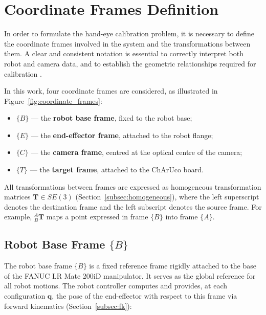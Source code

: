 \section{Coordinate Frames Definition}
\label{sec:coordinate_frames}

In order to formulate the hand-eye calibration problem, it is necessary to
define the coordinate frames involved in the system and the transformations
between them. A clear and consistent notation is essential to correctly
interpret both robot and camera data, and to establish the geometric
relationships required for calibration \cite{craig2005introduction,
siciliano2009robotics}.

In this work, four coordinate frames are considered, as illustrated in
Figure~\ref{fig:coordinate_frames}:

\begin{itemize}
    \item $\{B\}$ — the \textbf{robot base frame}, fixed to the robot base;
    \item $\{E\}$ — the \textbf{end-effector frame}, attached to the robot flange;
    \item $\{C\}$ — the \textbf{camera frame}, centred at the optical centre of
    the camera;
    \item $\{T\}$ — the \textbf{target frame}, attached to the ChArUco board.
\end{itemize}

All transformations between frames are expressed as homogeneous transformation
matrices $\mathbf{T} \in SE(3)$ (Section~\ref{subsec:homogeneous}), where the
left superscript denotes the destination frame and the left subscript denotes
the source frame. For example, ${}^A_B\mathbf{T}$ maps a point expressed in
frame $\{B\}$ into frame $\{A\}$.

\subsection{Robot Base Frame \texorpdfstring{$\{B\}$}{B}}
\label{subsec:frame_base}

The robot base frame $\{B\}$ is a fixed reference frame rigidly attached to the
base of the FANUC LR Mate 200iD manipulator. It serves as the global reference
for all robot motions. The robot controller computes and provides, at each
configuration $\mathbf{q}$, the pose of the end-effector with respect to this
frame via forward kinematics (Section~\ref{subsec:fk}):

